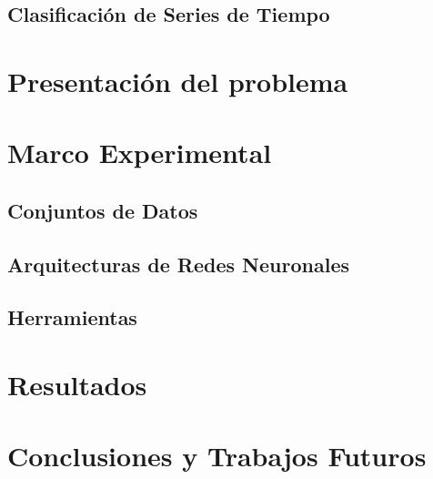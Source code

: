 \documentclass[a4paper,12pt,spanish]{book}
\begin{document}
\section{Clasificación de Series de Tiempo}



\chapter{Presentación del problema}



\chapter{Marco Experimental}

\section{Conjuntos de Datos}


\section{Arquitecturas de Redes Neuronales}


\section{Herramientas}



\chapter{Resultados}


\chapter{Conclusiones y Trabajos Futuros}

\newpage
\footnotesize
% 
% 
\printbibliography

\newpage
\newpage
\vfill
\addtocounter{page}{-1}
\clearpage
\thispagestyle{empty}
\phantom{a}
\vfill
\newpage
\vfill
\addtocounter{page}{-1}
\end{document}
